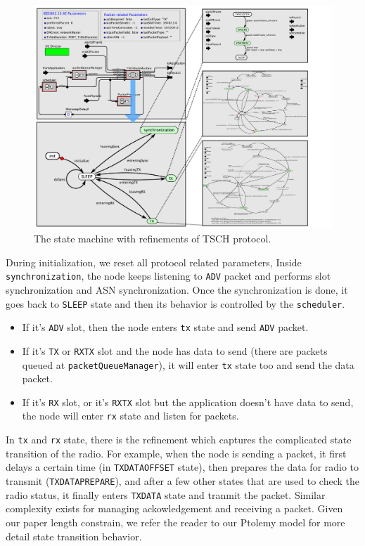 \begin{figure}[t]
\centering
\includegraphics[width=1\columnwidth]{figures/PaperTSCHStateMachine}
\caption{The state machine with refinements of TSCH protocol.}
\label{fig:TSCHSM}
\end{figure}

During initialization, we reset all protocol related parameters, Inside \texttt{synchronization}, the node keeps listening to \texttt{ADV} packet and performs slot synchronization and ASN synchronization. Once the synchronization is done, it goes back to \texttt{SLEEP} state and then its behavior is controlled by the \texttt{scheduler}. 
\begin{itemize}
\item If it's \texttt{ADV} slot, then the node enters \texttt{tx} state and send \texttt{ADV} packet. 
\item If it's \texttt{TX} or \texttt{RXTX} slot and the node has data to send (there are packets queued at \texttt{packetQueueManager}), it will enter \texttt{tx} state too and send the data packet. 
\item If it's \texttt{RX} slot, or it's \texttt{RXTX} slot but the application doesn't have data to send, the node will enter \texttt{rx} state and listen for packets.
\end{itemize}

In \texttt{tx} and \texttt{rx} state, there is the refinement which captures the complicated state transition of the radio. For example, when the node is sending a packet, it first delays a certain time (in \texttt{TXDATAOFFSET} state), then prepares the data for radio to transmit (\texttt{TXDATAPREPARE}), and after a few other states that are used to check the radio status, it finally enters \texttt{TXDATA} state and tranmit the packet. Similar complexity exists for managing ackowledgement and receiving a packet. Given our paper length constrain, we refer the reader to our Ptolemy model for more detail state transition behavior.

